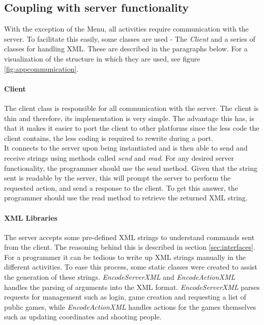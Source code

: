 \subsection{Coupling with server functionality}
\label{subsec:server-coupling}
With the exception of the Menu, all activities require communication with the server. To facilitate this easily, some classes are used - The \textit{Client} and a series of classes for handling XML. These are described in the paragraphs below. For a visualization of the structure in which they are used, see figure \ref{fig:appcommunication}.

\paragraph{Client}
The client class is responsible for all communication with the server. The client is thin and therefore, its implementation is very simple. The advantage this has, is that it makes it easier to port the client to other platforms since the less code the client contains, the less coding is required to rewrite during a port.\\

It connects to the server upon being instantiated and is then able to send and receive strings using methods called \textit{send} and \textit{read}. For any desired server functionality, the programmer should use the send method. Given that the string sent is readable by the server, this will prompt the server to perform the requested action, and send a response to the client. To get this answer, the programmer should use the read method to retrieve the returned XML string.

\paragraph{XML Libraries}
The server accepts some pre-defined XML strings to understand commands sent from the client. The reasoning behind this is described in section \ref{sec:interfaces}. For a programmer it can be tedious to write up XML strings manually in the different activities. To ease this process, some static classes were created to assist the generation of these strings. \textit{EncodeServerXML} and \textit{EncodeActionXML} handles the parsing of arguments into the XML format. \textit{EncodeServerXML} parses requests for management such as login, game creation and requesting a list of public games, while \textit{EncodeActionXML} handles actions for the games themselves such as updating coordinates and shooting people.


